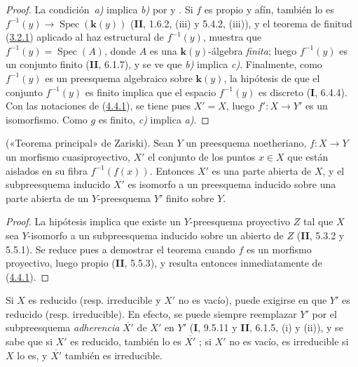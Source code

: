 \begin{proof}
La condición~\emph{a)} implica \emph{b)} por  y
. Si $f$ es propio y afín, también lo es
$f^{-1}(y)\to\operatorname{Spec}(\boldsymbol{k}(y))$ (\textbf{II}, 1.6.2, (iii) y 5.4.2, (iii)), y el teorema de finitud (\hyperref[III.3.2.1-fr]{3.2.1}) aplicado al haz estructural de $f^{-1}(y)$, muestra
que $f^{-1}(y)=\operatorname{Spec}(A)$, donde
$A$ es una $\boldsymbol{k}(y)$-álgebra \emph{finita}; luego $f^{-1}(y)$ es un conjunto finito (\textbf{II}, 6.1.7), y se ve que \emph{b)} implica \emph{c)}. Finalmente, como $f^{-1}(y)$ es un preesquema
algebraico sobre $\boldsymbol{k}(y)$, la hipótesis de que el conjunto $f^{-1}(y)$ es
finito implica que el espacio $f^{-1}(y)$ es discreto (\textbf{I}, 6.4.4). Con las
notaciones de (\hyperref[III.4.4.1-fr]{4.4.1}), se tiene pues $X'=X$, luego
$f':X\to Y'$ es un isomorfismo. Como $g$ es finito, \emph{c)} implica \emph{a)}.
\end{proof}

\begin{theorem}[4.4.3]
\label{III.4.4.3-fr}
\textnormal{(«Teorema principal» de Zariski).}
Sean $Y$ un preesquema noetheriano, $f:X\to Y$ un morfismo cuasiproyectivo,
$X'$ el conjunto de los puntos $x\in X$ que están aislados en su fibra
$f^{-1}(f(x))$. Entonces $X'$ es una parte abierta de $X$, y el
subpreesquema inducido $X'$ es isomorfo a un preesquema inducido sobre una parte
abierta de un $Y$-preesquema $Y'$ finito sobre $Y$.
\end{theorem}

\begin{proof}
La hipótesis implica que existe un $Y$-preesquema proyectivo $Z$ tal que $X$
sea $Y$-isomorfo a un subpreesquema inducido sobre un abierto de $Z$
(\textbf{II}, 5.3.2 y 5.5.1). Se reduce pues a demostrar el teorema cuando $f$
es un morfismo proyectivo, luego propio (\textbf{II}, 5.5.3), y resulta entonces
inmediatamente de (\hyperref[III.4.4.1-fr]{4.4.1}).
\end{proof}

\begin{remark}[4.4.4]
\label{III.4.4.4-fr}
Si $X$ es reducido (resp. irreducible y $X'$ no
es vacío), puede exigirse en  que $Y'$ es reducido (resp. irreducible). En efecto, se puede siempre reemplazar $Y'$ por el subpreesquema \emph{adherencia} $\overline{X'}$ de $X'$ en $Y'$ (\textbf{I}, 9.5.11 y \textbf{II}, 6.1.5, (i) y (ii)), y se sabe que si $X'$ es reducido, también
lo es $\overline{X'}$ ; si $X'$ no es vacío, es
irreducible si $X$ lo es, y $\overline{X'}$ también es irreducible.
\end{remark}

